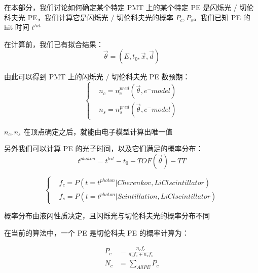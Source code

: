 \documentclass[12pt]{article}
\begin{document}

在本部分，我们讨论如何确定某个特定 PMT 上的某个特定 PE 是闪烁光 / 切伦科夫光 PE，我们计算它是闪烁光 / 切伦科夫光的概率 $P_c, P_s$。我们已知 PE 的 hit 时间 $t^{hit}$

在计算前，我们已有拟合结果：
\begin{equation}
    \vec{\theta} = (E, t_0, \vec{x}, \vec{d})
\end{equation}

由此可以得到 PMT 上的闪烁光 / 切伦科夫光 PE 数预期：
\begin{equation}
    \left\{
    \begin{aligned}
        & n_c = n_c^{pred}(\vec{\theta}, e^- model) \\
        & n_s = n_s^{pred}(\vec{\theta}, e^- model)
    \end{aligned}
    \right.
\end{equation}

$n_c, n_s$ 在顶点确定之后，就能由电子模型计算出唯一值

另外我们可以计算 PE 的光子时间，以及它们满足的概率分布：
\begin{equation}
    t^{photon} = t^{hit} - t_0 - TOF(\vec{\theta}) - TT
\end{equation}

\begin{equation}
    \left\{
    \begin{aligned}
        & f_c = P(t = t^{photon} | Cherenkov, LiCl scintillator) \\
        & f_s = P(t = t^{photon} | Scintillation, LiCl scintillator)
    \end{aligned}
    \right.
\end{equation}

概率分布由液闪性质决定，且闪烁光与切伦科夫光的概率分布不同

在当前的算法中，一个 PE 是切伦科夫 PE 的概率计算为：

\begin{equation}
    \begin{aligned}
        P_c & = \frac{n_c f_c}{n_c f_c + n_s f_s} \\
        N_c & = \sum_{All PE} P_c
    \end{aligned}
    \label{equ:nc-recon}
\end{equation}
\end{document}
